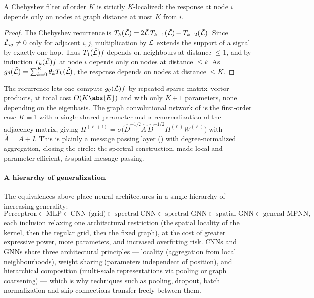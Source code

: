 \begin{theorem}
\label{thm:graphs:cheb-local}
A Chebyshev filter of order $K$ is strictly $K$-localized: the response at node
$i$ depends only on nodes at graph distance at most $K$ from $i$.
\end{theorem}

\begin{proof}
The Chebyshev recurrence is
$T_k(\tilde{\mathcal{L}}) = 2\tilde{\mathcal{L}}\, T_{k-1}(\tilde{\mathcal{L}}) - T_{k-2}(\tilde{\mathcal{L}})$. Since
$\tilde{\mathcal{L}}_{ij} \neq 0$ only for adjacent $i, j$, multiplication by $\tilde{\mathcal{L}}$
extends the support of a signal by exactly one hop. Thus $T_1(\tilde{\mathcal{L}}) f$
depends on neighbours at distance $\le 1$, and by induction $T_k(\tilde{\mathcal{L}}) f$
at node $i$ depends only on nodes at distance $\le k$. As
$g_\theta(\tilde{\mathcal{L}}) = \sum_{k=0}^K \theta_k T_k(\tilde{\mathcal{L}})$, the response
depends on nodes at distance $\le K$.
\end{proof}

The recurrence lets one compute $g_\theta(\tilde{\mathcal{L}}) f$ by repeated sparse
matrix--vector products, at total cost $O(K\abs{E})$ and with only $K+1$
parameters, none depending on the eigenbasis. The graph convolutional network of
\citet{kipf2017semi} is the first-order case $K = 1$ with a single shared
parameter and a renormalization of the adjacency matrix, giving
$H^{(\ell+1)} = \sigma\!\big(\hat D^{-1/2} \hat A\, \hat D^{-1/2} H^{(\ell)}
W^{(\ell)}\big)$ with $\hat A = A + I$. This is plainly a message passing layer
() with degree-normalized aggregation, closing the circle:
the spectral construction, made local and parameter-efficient, \emph{is} spatial
message passing.

\paragraph{A hierarchy of generalization.}
The equivalences above place neural architectures in a single hierarchy of
increasing generality:
\[
  \text{Perceptron} \subset \text{MLP} \subset \text{CNN (grid)}
    \subset \text{spectral CNN} \subset \text{spectral GNN}
    \subset \text{spatial GNN} \subset \text{general MPNN},
\]
each inclusion relaxing one architectural restriction (the spatial locality of
the kernel, then the regular grid, then the fixed graph), at the cost of greater
expressive power, more parameters, and increased overfitting risk. CNNs and GNNs
share three architectural principles --- locality (aggregation from local
neighbourhoods), weight sharing (parameters independent of position), and
hierarchical composition (multi-scale representations via pooling or graph
coarsening) --- which is why techniques such as pooling, dropout, batch
normalization and skip connections transfer freely between them.

